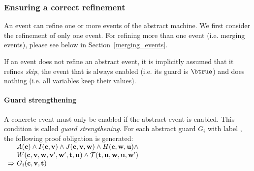 \subsubsection{Ensuring a correct refinement}
\label{refinement_proof_obligations}
An event can refine one or more events of the abstract machine.
We first consider the refinement of only one event. 
For refining more than one event (i.e. merging events), please see below in Section~\ref{merging_events}.

If an event does not refine an abstract event, it is implicitly assumed that it refines \emph{skip}, the
  event that is always enabled (i.e. its guard is $\btrue$) and does nothing (i.e. all variables keep their
  values).

\paragraph{Guard strengthening}
\label{guard_strengthening}
A concrete event must only be enabled if the abstract event is enabled.
This condition is called \emph{guard strengthening}.
For each abstract guard $G_i$ with label , the following
proof obligation is generated:
%
{}%
{$\begin{array}{r@{\ }l}
   & \axioms \land \absinvariants \land \concinvariants
  \land \concguards \land \\
  & \witnesspred \land \bapred  \\
  \limp & G_i(\allconstants,\absvariables,\absparameters)
  \end{array}$}

